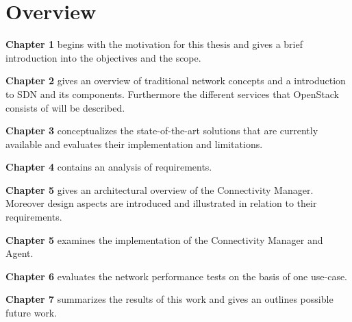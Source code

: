 \section{Overview}

\textbf{Chapter 1} begins with the motivation for this thesis and gives a brief introduction into the objectives and the scope.

\textbf{Chapter 2} gives an overview of traditional network concepts and a introduction to SDN and its components. Furthermore the different services that OpenStack consists of will be described.

\textbf{Chapter 3} conceptualizes the state-of-the-art solutions that are currently available and evaluates their implementation and limitations.

\textbf{Chapter 4} contains an analysis of requirements.

\textbf{Chapter 5} gives an architectural overview of the Connectivity Manager. Moreover design aspects are introduced and illustrated in relation to their requirements.

\textbf{Chapter 5} examines the implementation of the Connectivity Manager and Agent.

\textbf{Chapter 6} evaluates the network performance tests on the basis of one use-case.

\textbf{Chapter 7} summarizes the results of this work and gives an outlines possible future work.



